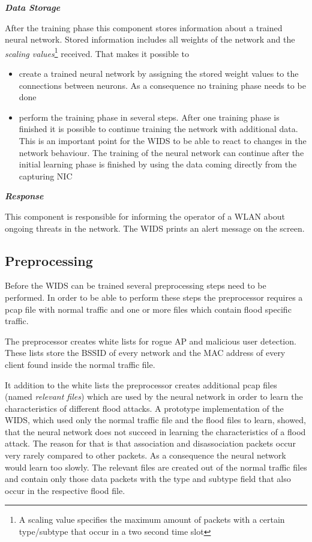 {\em {\bf Data Storage}}

After the training phase this component stores information about a trained neural network. Stored information includes all weights of the network and the {\em scaling values}\footnote{A scaling value specifies the maximum amount of packets with a certain type/subtype that occur in a two second time slot} received. That makes it possible to

\begin{itemize}
    \item create a trained neural network by assigning the stored weight values to the connections between neurons. As a consequence no training phase needs to be done
\vspace{1em}

	\item perform the training phase in several steps. After one training phase is finished it is possible to continue training the network with additional data. This is an important point for the WIDS to be able to react to changes in the network behaviour. The training of the neural network can continue after the initial learning phase is finished by using the data coming directly from the capturing NIC
\end{itemize}

{\em {\bf Response}}

This component is responsible for informing the operator of a WLAN about ongoing threats in the network. The WIDS prints an alert message on the screen.

\subsection{Preprocessing}
\label{sec:preprocessing}

Before the WIDS can be trained several preprocessing steps need to be performed. In order to be able to perform these steps the preprocessor requires a pcap file with normal traffic and one or more files which contain flood specific traffic.

The preprocessor creates white lists for rogue AP and malicious user detection. These lists store the BSSID of every network and the MAC address of every client found inside the normal traffic file.

It addition to the white lists the preprocessor creates additional pcap files (named {\em relevant files}) which are used by the neural network in order to learn the characteristics of different flood attacks. A prototype implementation of the WIDS, which used only the normal traffic file and the flood files to learn, showed, that the neural network does not succeed in learning the characteristics of a flood attack. The reason for that is that association and disassociation packets occur very rarely compared to other packets. As a consequence the neural network would learn too slowly. The relevant files are created out of the normal traffic files and contain only those data packets with the type and subtype field that also occur in the respective flood file.

